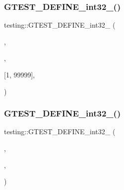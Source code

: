 \mbox{\label{namespacetesting_a9900d8db2670a26999fbc2a9130f7185}} 
\subsubsection{\texorpdfstring{G\+T\+E\+S\+T\+\_\+\+D\+E\+F\+I\+N\+E\+\_\+int32\+\_\+()}{GTEST\_DEFINE\_int32\_()}\hspace{0.1cm}{\footnotesize\ttfamily [1/3]}}
{\footnotesize\ttfamily testing\+::\+G\+T\+E\+S\+T\+\_\+\+D\+E\+F\+I\+N\+E\+\_\+int32\+\_\+ (\begin{DoxyParamCaption}\item[{random\+\_\+seed}]{,  }\item[{\hyperlink{namespacetesting_1_1internal_a0f7e728793f9e6cb0aa2b69eaa468bf3}{internal\+::\+Int32\+From\+G\+Test\+Env}(\char`\"{}random\+\_\+seed\char`\"{}, 0)}]{,  }\item[{\char`\"{}Random number seed to use when shuffling test orders. Must be in range \char`\"{} \char`\"{}}]{\mbox{[}1, 99999\mbox{]},  }\item[{or 0 to use a seed based on the current time.\char`\"{}}]{ }\end{DoxyParamCaption})}

\mbox{\label{namespacetesting_aae6f1140f03d7bf24067df0f6628e9ea}} 
\subsubsection{\texorpdfstring{G\+T\+E\+S\+T\+\_\+\+D\+E\+F\+I\+N\+E\+\_\+int32\+\_\+()}{GTEST\_DEFINE\_int32\_()}\hspace{0.1cm}{\footnotesize\ttfamily [2/3]}}
{\footnotesize\ttfamily testing\+::\+G\+T\+E\+S\+T\+\_\+\+D\+E\+F\+I\+N\+E\+\_\+int32\+\_\+ (\begin{DoxyParamCaption}\item[{repeat}]{,  }\item[{\hyperlink{namespacetesting_1_1internal_a0f7e728793f9e6cb0aa2b69eaa468bf3}{internal\+::\+Int32\+From\+G\+Test\+Env}(\char`\"{}repeat\char`\"{}, 1)}]{,  }\item[{\char`\"{}How many times to repeat each test. Specify a negative number \char`\"{} \char`\"{}for repeating forever. Useful for shaking out flaky tests.\char`\"{}}]{ }\end{DoxyParamCaption})}

